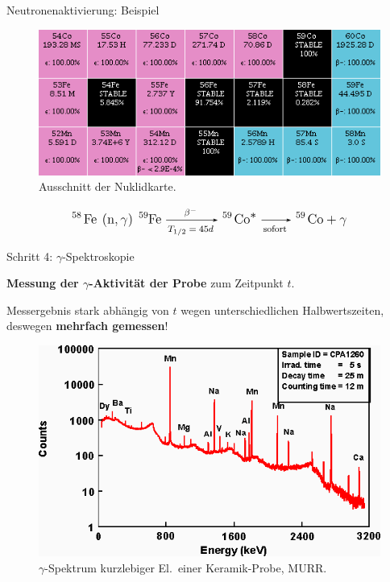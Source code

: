 \documentclass[xcolor=x11names, aspectratio=169]{beamer}
\begin{document}
\begin{frame}{Neutronenaktivierung: Beispiel}
\begin{figure}
\includegraphics[height=.45\textheight]{img/nuclidchart.png}
\caption{Ausschnitt der Nuklidkarte.}
\end{figure}
\vspace*{-1em}
\[\large\text{\ce{^{58} Fe \:(n,$\gamma$)\: ^{59}Fe ->[$\beta^-$][$T_{1/2}=45d$] ^{59} Co^* ->[][sofort] ^{59} Co + $\gamma$}}\]
\end{frame}

\begin{frame}{Schritt 4: $\gamma$-Spektroskopie}
\begin{minipage}{0.4\textwidth}\flushleft
\textbf{Messung der $\gamma$-Aktivität der Probe} zum Zeitpunkt $t$.\medskip

Messergebnis \alert{stark abhängig von $t$} wegen unterschiedlichen Halbwertszeiten, deswegen \textbf{mehrfach gemessen}!
\end{minipage}\hfill
\begin{minipage}{0.56\textwidth}
\begin{figure}
\includegraphics[width=\textwidth]{img/spect-1.png}
\caption{$\gamma$-Spektrum kurzlebiger El.\ einer Keramik-Probe, MURR.}
\end{figure}
\end{minipage}
\end{frame}
\end{document}
